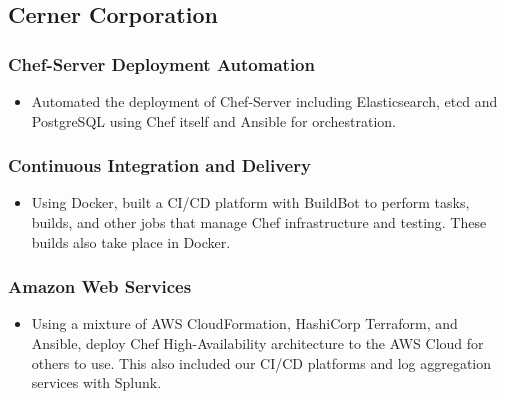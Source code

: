 \documentclass{article}
\begin{document}
    \subsection{Cerner Corporation}

      \begin{scriptsize}

      \subsubsection{Chef-Server Deployment Automation}

        \begin{itemize}

          \item Automated the deployment of Chef-Server including
            Elasticsearch, etcd and PostgreSQL using Chef itself and Ansible
            for orchestration.

        \end{itemize}

      \subsubsection{Continuous Integration and Delivery}

        \begin{itemize}

          \item Using Docker, built a CI/CD platform with BuildBot to perform
            tasks, builds, and other jobs that manage Chef infrastructure and
            testing. These builds also take place in Docker.

        \end{itemize}

      \subsubsection{Amazon Web Services}

        \begin{itemize}

          \item Using a mixture of AWS CloudFormation, HashiCorp Terraform, and
            Ansible, deploy Chef High-Availability architecture to the AWS
            Cloud for others to use. This also included our CI/CD platforms and
            log aggregation services with Splunk.

        \end{itemize}

      \end{scriptsize}
\end{document}
